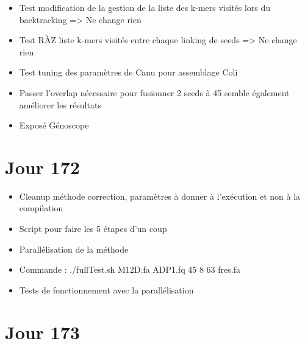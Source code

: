 \documentclass[12pt]{report}
\begin{document}
\begin{itemize}
	\item Test modification de la gestion de la liste des k-mers visités lors du backtracking => Ne change rien
	
	\item Test RÀZ liste k-mers visités entre chaque linking de seeds => Ne change rien
	
	\item Test tuning des paramètres de Canu pour assemblage Coli
	
	\item Passer l'overlap nécessaire pour fusionner 2 seeds à 45 semble également améliorer les résultats

	\item Exposé Génoscope
\end{itemize}

\section{Jour 172}

\begin{itemize}
	\item Cleanup méthode correction, paramètres à donner à l'exécution et non à la compilation
	
	\item Script pour faire les 5 étapes d'un coup
	
	\item Parallélisation de la méthode
	
	\item Commande : ./fullTest.sh M12D.fa ADP1.fq 45 8 63 fres.fa
	
	\item Tests de fonctionnement avec la parallélisation
\end{itemize}

\section{Jour 173}
\end{document}
